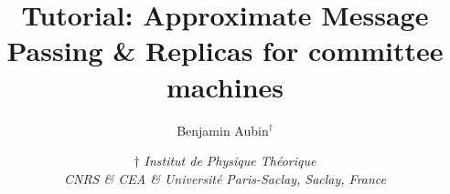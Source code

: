 \documentclass[a4paper,11pt]{article}
\begin{document}
\title{\huge Tutorial: Approximate Message Passing \& Replicas for committee machines}
\author{Benjamin Aubin$^\dagger$}
\date{
$\dagger$ \textit{Institut de Physique Th\'eorique \\
CNRS \& CEA \& Universit\'e Paris-Saclay, Saclay, France}\\
}

\maketitle
\makeatletter
\tableofcontents
\newpage

\newcommand{\ndim}{d}
\newcommand{\nsamples}{n}
\newcommand{\indsamples}{\mu}
\newcommand{\inddim}{i}





\newpage


\newpage


\newpage


\end{document}
